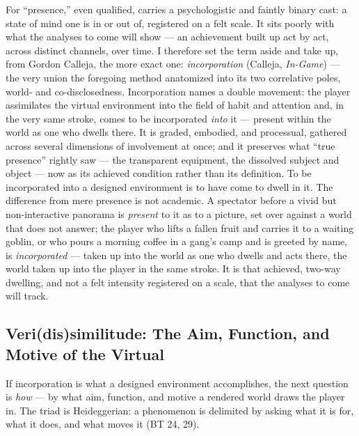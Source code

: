 \documentclass{article}
\begin{document}
For ``presence,'' even qualified, carries a psychologistic and faintly binary cast: a state of mind one is in or out of, registered on a felt scale. It sits poorly with what the analyses to come will show — an achievement built up act by act, across distinct channels, over time. I therefore set the term aside and take up, from Gordon Calleja, the more exact one: \textit{incorporation} (Calleja, \textit{In-Game}) — the very union the foregoing method anatomized into its two correlative poles, world- and co-disclosedness. Incorporation names a double movement: the player assimilates the virtual environment into the field of habit and attention and, in the very same stroke, comes to be incorporated \textit{into} it — present within the world as one who dwells there. It is graded, embodied, and processual, gathered across several dimensions of involvement at once; and it preserves what ``true presence'' rightly saw — the transparent equipment, the dissolved subject and object — now as its achieved condition rather than its definition. To be incorporated into a designed environment is to have come to dwell in it. The difference from mere presence is not academic. A spectator before a vivid but non-interactive panorama is \textit{present} to it as to a picture, set over against a world that does not answer; the player who lifts a fallen fruit and carries it to a waiting goblin, or who pours a morning coffee in a gang's camp and is greeted by name, is \textit{incorporated} — taken up into the world as one who dwells and acts there, the world taken up into the player in the same stroke. It is that achieved, two-way dwelling, and not a felt intensity registered on a scale, that the analyses to come will track.

\bigskip

\subsection*{Veri(dis)similitude: The Aim, Function, and Motive of the Virtual}

If incorporation is what a designed environment accomplishes, the next question is \textit{how} — by what aim, function, and motive a rendered world draws the player in. The triad is Heideggerian: a phenomenon is delimited by asking what it is for, what it does, and what moves it (BT 24, 29).
\end{document}
